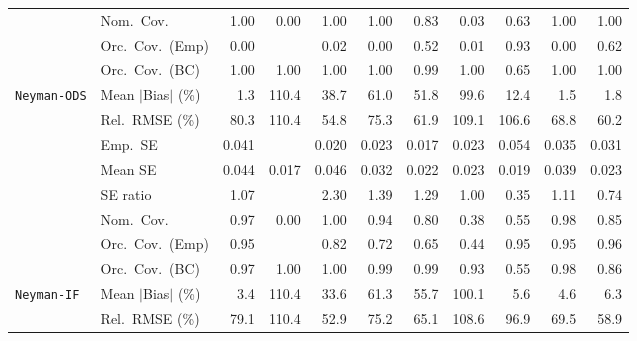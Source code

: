 \begin{landscape}
\begin{longtable}{llrrrrrrrrr}
 & Nom.\ Cov. & \cellcolor{rankone}1.00 & 0.00 & \cellcolor{rankone}1.00 & \cellcolor{rankone}1.00 & \cellcolor{ranktwo}0.83 & 0.03 & \cellcolor{rankthree}0.63 & \cellcolor{rankone}1.00 & \cellcolor{rankone}1.00 \\
 & Orc.\ Cov.\ (Emp) & 0.00 &  & 0.02 & 0.00 & \cellcolor{rankthree}0.52 & 0.01 & \cellcolor{rankone}0.93 & 0.00 & \cellcolor{ranktwo}0.62 \\
 & Orc.\ Cov.\ (BC) & \cellcolor{ranktwo}1.00 & \cellcolor{ranktwo}1.00 & \cellcolor{ranktwo}1.00 & \cellcolor{ranktwo}1.00 & \cellcolor{rankone}0.99 & \cellcolor{ranktwo}1.00 & \cellcolor{rankthree}0.65 & \cellcolor{ranktwo}1.00 & \cellcolor{ranktwo}1.00 \\
\addlinespace[2pt]
\quad \texttt{Neyman-ODS} & Mean $|$Bias$|$ (\%) & \cellcolor{rankone}1.3 & 110.4 & 38.7 & 61.0 & 51.8 & 99.6 & 12.4 & \cellcolor{ranktwo}1.5 & \cellcolor{rankthree}1.8 \\
 & Rel.\ RMSE (\%) & 80.3 & 110.4 & \cellcolor{rankone}54.8 & 75.3 & \cellcolor{rankthree}61.9 & 109.1 & 106.6 & 68.8 & \cellcolor{ranktwo}60.2 \\
 & Emp.\ SE & 0.041 &  & 0.020 & 0.023 & 0.017 & 0.023 & 0.054 & 0.035 & 0.031 \\
 & Mean SE & 0.044 & 0.017 & 0.046 & 0.032 & 0.022 & 0.023 & 0.019 & 0.039 & 0.023 \\
 & SE ratio & \cellcolor{ranktwo}1.07 &  & 2.30 & 1.39 & 1.29 & \cellcolor{rankone}1.00 & 0.35 & \cellcolor{rankthree}1.11 & 0.74 \\
 & Nom.\ Cov. & \cellcolor{ranktwo}0.97 & 0.00 & 1.00 & \cellcolor{rankone}0.94 & 0.80 & 0.38 & 0.55 & \cellcolor{rankthree}0.98 & 0.85 \\
 & Orc.\ Cov.\ (Emp) & \cellcolor{rankone}0.95 &  & \cellcolor{rankthree}0.82 & 0.72 & 0.65 & 0.44 & \cellcolor{rankone}0.95 & \cellcolor{rankone}0.95 & \cellcolor{ranktwo}0.96 \\
 & Orc.\ Cov.\ (BC) & \cellcolor{rankone}0.97 & 1.00 & 1.00 & \cellcolor{rankthree}0.99 & \cellcolor{rankthree}0.99 & \cellcolor{rankone}0.93 & 0.55 & \cellcolor{ranktwo}0.98 & 0.86 \\
\addlinespace[2pt]
\quad \texttt{Neyman-IF} & Mean $|$Bias$|$ (\%) & \cellcolor{rankone}3.4 & 110.4 & 33.6 & 61.3 & 55.7 & 100.1 & \cellcolor{rankthree}5.6 & \cellcolor{ranktwo}4.6 & 6.3 \\
 & Rel.\ RMSE (\%) & 79.1 & 110.4 & \cellcolor{rankone}52.9 & 75.2 & \cellcolor{rankthree}65.1 & 108.6 & 96.9 & 69.5 & \cellcolor{ranktwo}58.9 \\

\end{longtable}
\end{landscape}
